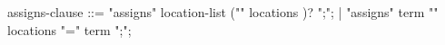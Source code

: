 \begin{syntax}
assigns-clause ::= "assigns" location-list ("\from" locations )? ";";
                 | "assigns" term "\from" locations {"=" term ";"};
\end{syntax}
